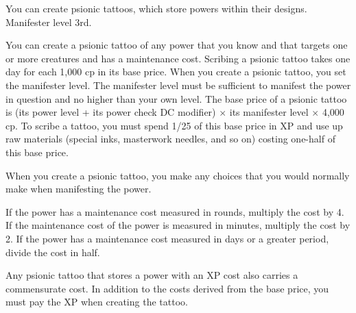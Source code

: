 {You can create psionic tattoos, which store powers within their designs.}
{Manifester level 3rd.}
{You can create a psionic tattoo of any power that you know and that targets one or more creatures and has a maintenance cost. Scribing a psionic tattoo takes one day for each 1,000 cp in its base price. When you create a psionic tattoo, you set the manifester level. The manifester level must be sufficient to manifest the power in question and no higher than your own level. The base price of a psionic tattoo is (its power level + its power check DC modifier) $\times$ its manifester level $\times$ 4,000 cp. To scribe a tattoo, you must spend 1/25 of this base price in XP and use up raw materials (special inks, masterwork needles, and so on) costing one-half of this base price.

When you create a psionic tattoo, you make any choices that you would normally make when manifesting the power.

If the power has a maintenance cost measured in rounds, multiply the cost by 4. If the maintenance cost of the power is measured in minutes, multiply the cost by 2. If the power has a maintenance cost measured in days or a greater period, divide the cost in half.

Any psionic tattoo that stores a power with an XP cost also carries a commensurate cost. In addition to the costs derived from the base price, you must pay the XP when creating the tattoo.}{}{}




